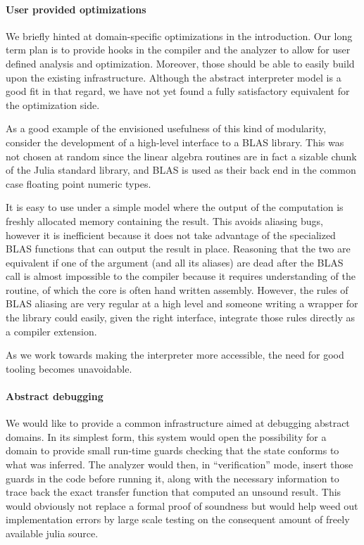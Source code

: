 \documentclass[11pt]{article}
\begin{document}
\paragraph{User provided optimizations} We briefly hinted at domain-specific optimizations in the introduction.
Our long term plan is to provide hooks in the compiler and the analyzer to allow for user defined analysis and optimization.
Moreover, those should be able to easily build upon the existing infrastructure.
Although the abstract interpreter model is a good fit in that regard, we have not yet found a fully satisfactory equivalent for the optimization side.

As a good example of the envisioned usefulness of this kind of modularity, consider the development of a high-level interface to a BLAS library.
This was not chosen at random since the linear algebra routines are in fact a sizable chunk of the Julia standard library, and BLAS is used as their back end in the common case floating point numeric types.

It is easy to use under a simple model where the output of the computation is freshly allocated memory containing the result. This avoids aliasing bugs, however it is inefficient because it does not take advantage of the specialized BLAS functions that can output the result in place. Reasoning that the two are equivalent if one of the argument (and all its aliases) are dead after the BLAS call is almost impossible to the compiler because it requires understanding of the routine, of which the core is often hand written assembly.
However, the rules of BLAS aliasing are very regular at a high level and someone writing a wrapper for the library could easily, given the right interface, integrate those rules directly as a compiler extension.

As we work towards making the interpreter more accessible, the need for good tooling becomes unavoidable.

\paragraph{Abstract debugging} We would like to provide a common infrastructure aimed at debugging abstract domains.
In its simplest form, this system would open the possibility for a domain to provide small run-time guards checking that the state conforms to what was inferred.
The analyzer would then, in ``verification'' mode, insert those guards in the code before running it, along with the necessary information to trace back the exact transfer function that computed an unsound result.
This would obviously not replace a formal proof of soundness but would help weed out implementation errors by large scale testing on the consequent amount of freely available julia source.
\end{document}
